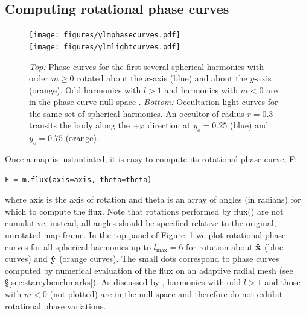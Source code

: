 \documentclass[modern]{aastex61}
\begin{document}
\subsection{Computing rotational phase curves}
\label{sec:starryphasecurves}
%
\begin{figure}[p!]
    \begin{centering}
    \texttt{[image: figures/ylmphasecurves.pdf]}
    \\[1em]
    \texttt{[image: figures/ylmlightcurves.pdf]}
    \caption{\label{fig:ylmlightcurves}
             \emph{Top:} Phase curves for the first several spherical
             harmonics with order $m \ge 0$ rotated about the $x$-axis
             (blue) and about the $y$-axis (orange).
             Odd harmonics with $l > 1$ and harmonics with $m < 0$ are
             in the phase curve null space \citep{CowanFuentesHaggard2013}.
             \emph{Bottom:} Occultation light curves for the same
             set of spherical harmonics. An occultor of radius $r=0.3$
             transits the body along the $+\mbox{$x$}$ direction at $y_o = 0.25$
             (blue) and $y_o = 0.75$ (orange). }
    \end{centering}
\end{figure}
%
Once a map is instantiated, it is easy to compute its rotational
phase curve, \textsf{F}:
%
\begin{lstlisting}[language=Python,firstnumber=last]
F = m.flux(axis=axis, theta=theta)
\end{lstlisting}
%
where \textsf{axis} is the axis of rotation and \textsf{theta} is an array of
angles (in radians) for which to compute the flux. Note that rotations performed
by \textsf{flux()} are not cumulative; instead, all angles should be specified
relative to the original, unrotated map frame.
%
In the top panel of Figure~\ref{fig:ylmlightcurves} we plot rotational phase curves
for all spherical harmonics
up to $l_\mathrm{max} = 6$ for rotation about $\mathbf{\hat{x}}$ (blue curves) and $\mathbf{\hat{y}}$
(orange curves). The small dots correspond to phase curves computed by numerical
evaluation of the flux on an adaptive radial mesh (see \S\ref{sec:starrybenchmarks}).
As discussed by \citet{CowanFuentesHaggard2013}, harmonics with
odd $l > 1$ and those with $m < 0$ (not plotted) are in the null space and
therefore do not exhibit rotational phase variations.

%
\end{document}
